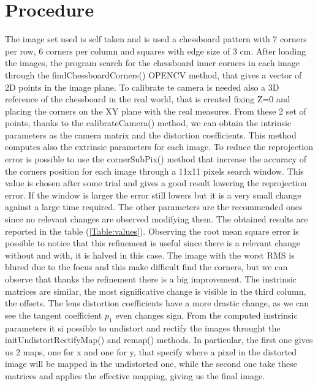 \documentclass[11pt,a4paper]{article}
\newcommand{\cc}{\fontfamily{txtt}\selectfont}
\begin{document}
\section{Procedure}
The image set used is self taken and is used a chessboard pattern with 7 corners per row, 6 corners per column and squares with edge size of 3 cm.
After loading the images, the program search for the chessboard inner corners in each image through the {\cc findChessboardCorners()} OPENCV method, that gives a vector of 2D points in the image plane.
To calibrate te camera is needed also a 3D reference of the chessboard in the real world, that is created fixing Z=0 and placing the corners on the XY plane with the real measures.
From these 2 set of points, thanks to the {\cc calibrateCamera()} method, we can obtain the intrinsic parameters as the camera matrix and the distortion coefficients. This method computes also the extrinsic parameters for each image.
To reduce the reprojection error is possible to use the {\cc cornerSubPix()} method that increase the accuracy of the corners position for each image through a 11x11 pixels search window. 
This value is chosen after some trial and gives a good result lowering the reprojection error.
If the window is larger the error still lowers but it is a very small change against a large time required.
The other parameters are the recommended ones since no relevant changes are observed modifying them.\newline
The obtained results are reported in the table (\ref{Table:values}). 
Observing the root mean square error is possible to notice that this refinement is useful since there is a relevant change without and with, it is halved in this case.
The image with the worst RMS is blured due to the focus and this make difficult find the corners, but we can observe that thanks the refinement there is a big improvement.
The instrinsic matrices are similar, the most significative change is visible in the third column, the offsets.
The lens distortion coefficients have a more drastic change, as we can see the tangent coefficient $p_1$ even changes sign.\newline
From the computed instrinsic parameters it si possible to undistort and rectify the images throught the {\cc initUndistortRectifyMap()} and {\cc remap()} methods.
In particular, the first one gives us 2 maps, one for x and one for y, that specify where a pixel in the distorted image will be mapped in the undistorted one, while the second one take these matrices and applies the effective mapping, giving us the final image.
\end{document}
